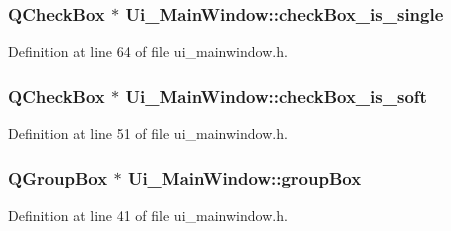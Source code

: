 \subsubsection[{\texorpdfstring{check\+Box\+\_\+is\+\_\+single}{checkBox_is_single}}]{\setlength{\rightskip}{0pt plus 5cm}Q\+Check\+Box $\ast$ Ui\+\_\+\+Main\+Window\+::check\+Box\+\_\+is\+\_\+single}\hypertarget{class_ui___main_window_abe81712792b45ca304d2d64d47733240}{}\label{class_ui___main_window_abe81712792b45ca304d2d64d47733240}


Definition at line 64 of file ui\+\_\+mainwindow.\+h.

\subsubsection[{\texorpdfstring{check\+Box\+\_\+is\+\_\+soft}{checkBox_is_soft}}]{\setlength{\rightskip}{0pt plus 5cm}Q\+Check\+Box $\ast$ Ui\+\_\+\+Main\+Window\+::check\+Box\+\_\+is\+\_\+soft}\hypertarget{class_ui___main_window_aba7882352e93b6723bfdc1fcfae07cb3}{}\label{class_ui___main_window_aba7882352e93b6723bfdc1fcfae07cb3}


Definition at line 51 of file ui\+\_\+mainwindow.\+h.

\subsubsection[{\texorpdfstring{group\+Box}{groupBox}}]{\setlength{\rightskip}{0pt plus 5cm}Q\+Group\+Box $\ast$ Ui\+\_\+\+Main\+Window\+::group\+Box}\hypertarget{class_ui___main_window_ad396eaa8d855b13559c50e02164b8325}{}\label{class_ui___main_window_ad396eaa8d855b13559c50e02164b8325}


Definition at line 41 of file ui\+\_\+mainwindow.\+h.

